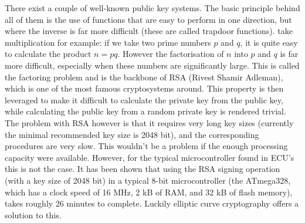 \documentclass[11pt]{article}
\begin{document}
There exist a couple of well-known public key systems. The basic principle behind all of them is the use of functions that are easy to perform in one direction, but where the inverse is far more difficult (these are called trapdoor functions). take multiplication for example: if we take two prime numbers $p$ and $q$, it is quite easy to calculate the product $ n=pq $. However the factorisation of $n$ into $p$ and $q$ is far more difficult, especially when these numbers are significantly large. This is called the factoring problem and is the backbone of RSA (Rivest Shamir Adleman), which is one of the most famous cryptosystems around. This property is then leveraged to make it difficult to calculate the private key from the public key, while calculating the public key from a random private key is rendered trivial. The problem with RSA however is that it requires very long key sizes (currently the minimal recommended key size is 2048 bit), and the corresponding procedures are very slow. This wouldn't be a problem if the enough processing capacity were available. However, for the typical microcontroller found in ECU's this is not the case. It has been shown that using the RSA signing operation (with a key size of 2048 bit) in a typical 8-bit microcontroller (the ATmega328, which has a clock speed of 16 MHz, 2 kB of RAM, and 32 kB of flash memory), takes roughly 26 minutes to complete\cite{Sethi}. Luckily elliptic curve cryptography offers a solution to this.
\end{document}
